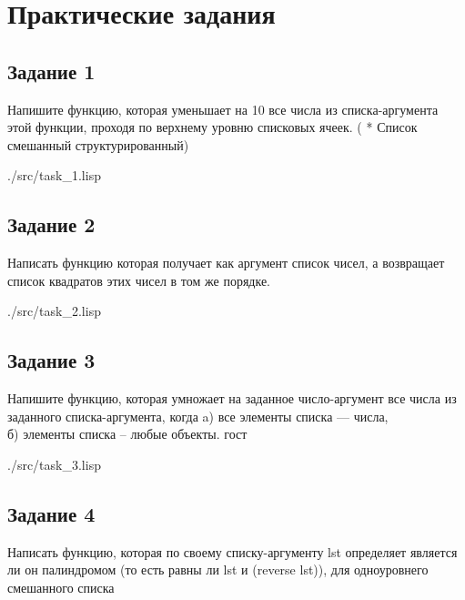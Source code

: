 \chapter*{Практические задания}

\section*{Задание 1}
Напишите функцию, которая уменьшает на 10 все числа из списка-аргумента этой функции, проходя по верхнему уровню списковых ячеек. ( * Список смешанный структурированный)

\begin{lstinputlisting}[
	caption={Задание 1},
	label={lst:t1},
	style={lsp},
	]{./src/task_1.lisp}
\end{lstinputlisting}

\section*{Задание 2}

Написать функцию которая получает как аргумент список чисел, а возвращает список квадратов этих чисел в том же порядке.

\begin{lstinputlisting}[
	caption={Задание 2},
	label={lst:t2},
	style={lsp},
	]{./src/task_2.lisp}
\end{lstinputlisting}

\section*{Задание 3}

Напишите функцию, которая умножает на заданное число-аргумент все числа из
заданного списка-аргумента, когда
a) все элементы списка --- числа,\\
б) элементы списка -- любые объекты.
гост
\begin{lstinputlisting}[
	caption={Задание 3},
	label={lst:t3},
	style={lsp},
	]{./src/task_3.lisp}
\end{lstinputlisting}

\section*{Задание 4}

Написать функцию, которая по своему списку-аргументу lst определяет является ли он
палиндромом (то есть равны ли lst и (reverse lst)), для одноуровнего смешанного
списка 


